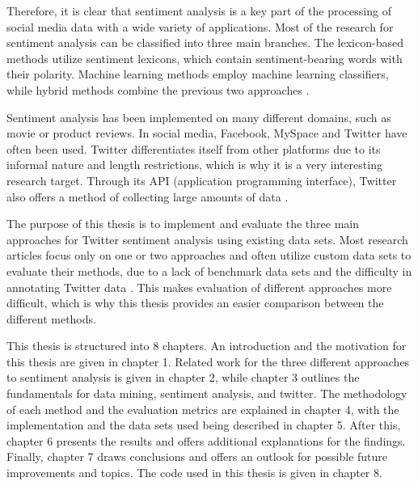 Therefore, it is clear that sentiment analysis is a key part of the processing of social media data with a wide variety of applications. Most of the research for sentiment analysis can be classified into three main branches. The lexicon-based methods utilize sentiment lexicons, which contain sentiment-bearing words with their polarity. Machine learning methods employ machine learning classifiers, while hybrid methods combine the previous two approaches \cite{MEDHAT20141093}.

Sentiment analysis has been implemented on many different domains, such as movie or product reviews. In social media, Facebook, MySpace and Twitter have often been used. Twitter differentiates itself from other platforms due to its informal nature and length restrictions, which is why it is a very interesting research target. Through its API (application programming interface), Twitter also offers a method of collecting large amounts of data \cite{DBLP:journals/csur/GiachanouC16}.

The purpose of this thesis is to implement and evaluate the three main approaches for Twitter sentiment analysis using existing data sets. Most research articles focus only on one or two approaches and often utilize custom data sets to evaluate their methods, due to a lack of benchmark data sets and the difficulty in annotating Twitter data \cite{DBLP:journals/csur/GiachanouC16}. This makes evaluation of different approaches more difficult, which is why this thesis provides an easier comparison between the different methods.

This thesis is structured into 8 chapters. An introduction and the motivation for this thesis are given in chapter 1. Related work for the three different approaches to sentiment analysis is given in chapter 2, while chapter 3 outlines the fundamentals for data mining, sentiment analysis, and twitter. The methodology of each method and the evaluation metrics are explained in chapter 4, with the implementation and the data sets used being described in chapter 5. After this, chapter 6 presents the results and offers additional explanations for the findings. Finally, chapter 7 draws conclusions and offers an outlook for possible future improvements and topics. The code used in this thesis is given in chapter 8.




